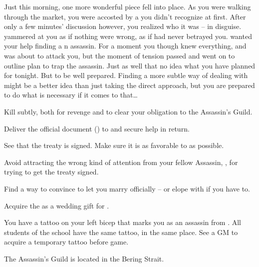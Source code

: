 \documentclass[char]{NeptuneBall}
\begin{document}
Just this morning, one more wonderful piece fell into place. As you were walking through the market, you were accosted by a \cQueen{\mer} you didn't recognize at first. After only a few minutes' discussion however, you realized who it was -- \cQueen{} in disguise. \cQueen{\They} yammered at you as if nothing were wrong, as if \cQueen{\they} had never betrayed you. \cQueen{} wanted your help finding a \pPacifica{}n assassin. For a moment you though \cQueen{\they} knew everything, and was about to attack you, but the moment of tension passed and \cQueen{\they} went on to outline \cQueen{\their} plan to trap the assassin. Just as well that \cQueen{\they} \cQueen{\have} no idea what you have planned for \cQueen{\them} tonight. But \cQueen{\they}  to be well prepared. Finding a more subtle way of dealing with \cQueen{\them} might be a better idea than just taking the direct approach, but you are prepared to do what is necessary if it comes to that\ldots

\begin{itemz}[Goals]
  \item Kill \cQueen{} subtly, both for revenge and to clear your obligation to the Assassin's Guild.
	\item Deliver the official document (\iBirthCertificate{\MYnumber}) to \cManta{} and secure \cManta{\their} help in return.
  \item See that the treaty is signed. Make sure it is as favorable to \pPacifica{} as possible.
	\item Avoid attracting the wrong kind of attention from your fellow Assassin, \cSpy{}, for trying to get the treaty signed.
  \item Find a way to convince \cKing{} to let you marry \cPrincess{} officially -- or elope with \cPrincess{} if you have to.
  \item Acquire the \iGlowShell{} as a wedding gift for \cPrincess{}.
\end{itemz}

\begin{itemz}[Notes]
  \item You have a tattoo on your left bicep that marks you as an assassin from \pAssassin{}. All students of the school have the same tattoo, in the same place. See a GM to acquire a temporary tattoo before game.
\end{itemz}

\begin{itemz}[Trivia]
  \item The Assassin's Guild is located in the Bering Strait.
\end{itemz}
\end{document}
